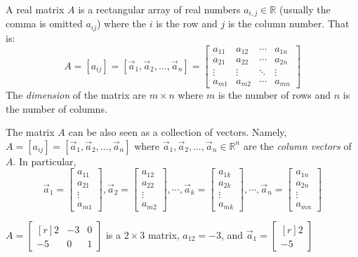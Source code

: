 \begin{definition}
A real matrix $A$ is a rectangular array of real numbers $a_{i,j} \in 
\mathbb{R}$ (usually the comma is omitted $a_{ij}$)  where the $i$ is the row 
and $j$ is the column number. That is:
\[
A=[a_{ij}]=[\vec{a}_1, \vec{a}_2, \ldots, \vec{a}_n]=
\begin{bmatrix}
a_{11} & a_{12} & \cdots & a_{1n} \\
a_{21} & a_{22} & \cdots & a_{2n} \\
\vdots & \vdots & \ddots & \vdots \\
a_{m1} & a_{m2} & \cdots & a_{mn} 
\end{bmatrix}
\]
The \emph{dimension} of the matrix are $m\times n$ where $m$ is the number of 
rows and $n$ is the number of columns. 
\end{definition}
The matrix $A$ can be also seen as a collection of vectors. Namely, 
$A=[a_{ij}]=[\vec{a}_1, \vec{a}_2, \ldots, \vec{a}_n]$ where 
 $\vec{a}_1, \vec{a}_2,\ldots, \vec{a}_n \in \mathbb{R}^n$ are the \emph{column 
vectors} of $A$. In particular, 
\[
\vec{a}_1=\begin{bmatrix}a_{11}\\a_{21}\\ \vdots \\ a_{m1}\end{bmatrix},
\vec{a}_2=\begin{bmatrix}a_{12}\\a_{22}\\ \vdots \\ a_{m2}\end{bmatrix}, \cdots,
\vec{a}_k=\begin{bmatrix}a_{1k}\\a_{2k}\\ \vdots \\ a_{mk}\end{bmatrix}, \cdots,
\vec{a}_n=\begin{bmatrix}a_{1n}\\a_{2n}\\ \vdots \\ a_{mn}\end{bmatrix}
\]

\begin{example}
$A=\begin{bmatrix*}[r]
2 & -3 & 0 \\
-5 & 0 & 1 
\end{bmatrix*}$
is a $2 \times 3$ matrix, $a_{12}=-3$, and  
$\vec{a}_1=\begin{bmatrix*}[r] 2 \\ -5 \end{bmatrix*} $
\end{example}

